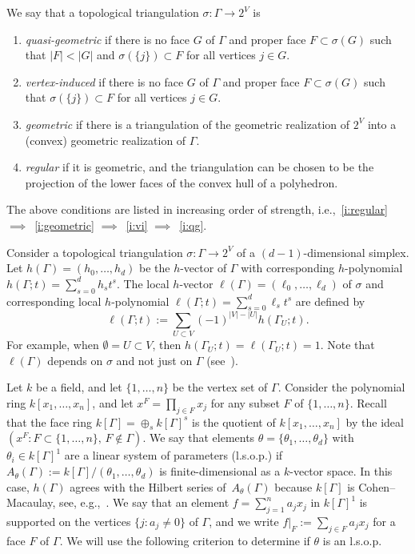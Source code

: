 We say that a topological triangulation $\sigma \colon \Gamma \to 2^V$ is 
\begin{enumerate}
\item\label{i:qg} \emph{quasi-geometric} if there is no face $G$ of $\Gamma$ and proper face $F \subset \sigma(G)$
such that $|F| < |G|$ and $\sigma(\{ j\}) \subset F$ for all vertices $j \in G$. 

\item\label{i:vi} \emph{vertex-induced}  
if there is no face $G$ of $\Gamma$ and proper face $F \subset \sigma(G)$ such that $\sigma(\{ j\}) \subset F$ for all vertices $j \in G$. 

\item\label{i:geometric} \emph{geometric} if there is a triangulation of the geometric realization of $2^V$ into a (convex) geometric realization of $\Gamma$. 

\item\label{i:regular} \emph{regular} if it is geometric, and the triangulation can be chosen to be the projection of the lower faces of the convex hull of a polyhedron. 
\end{enumerate}
The above conditions are listed in increasing order of strength, i.e.,~\eqref{i:regular} $\implies$~\eqref{i:geometric} $\implies$~\eqref{i:vi} $\implies$~\eqref{i:qg}. 

Consider a topological triangulation $\sigma \colon \Gamma \to 2^V$ of a $(d - 1)$-dimensional simplex. Let $h(\Gamma) = (h_0,\ldots,h_d)$ be the $h$-vector of $\Gamma$ with corresponding $h$-polynomial $h(\Gamma;t) = \sum_{s = 0}^d h_s t^s$. 
The local $h$-vector $\ell(\Gamma) = (\ell_0,\ldots,\ell_d)$ of $\sigma$ and corresponding local $h$-polynomial $\ell(\Gamma;t) = \sum_{s = 0}^d \ell_s t^s$
are defined by 
\begin{equation}\label{eq:localh}
\ell(\Gamma;t) := \sum_{U \subset V} (-1)^{|V| - |U|} h(\Gamma_U;t). 
\end{equation}
For example, when $\emptyset = U \subset V$, then $h(\Gamma_U;t) = \ell(\Gamma_U;t) = 1$. Note that  $\ell(\Gamma)$ depends on $\sigma$ and not just on $\Gamma$ (see~\cite[Example~2.3e]{Stanleylocalh}). 

Let $k$ be a field, and let $\{ 1, \ldots, n \}$ be the vertex set of $\Gamma$. Consider the polynomial ring $k[x_1,\ldots,x_n]$, and let $x^F = \prod_{j \in F} x_j$ for any subset $F$ of $\{ 1, \ldots, n \}$. 
Recall that the face ring $k[\Gamma] = \oplus_s k[\Gamma]^s$ 
is the quotient of $k[x_1,\ldots,x_n]$ by the ideal \mbox{$(x^F : F \subset \{ 1, \ldots, n \}, \, F \notin \Gamma )$}. 
We say that elements $ \theta = \{ \theta_1,\ldots,\theta_d \}$ with $\theta_i \in k[\Gamma]^1$ are a linear system of parameters (l.s.o.p.) if $A_\theta(\Gamma) := k[\Gamma]/(\theta_1, \dotsc, \theta_d)$ is finite-dimensional as a $k$-vector space. In this case, $h(\Gamma)$ agrees with the Hilbert series of~$A_\theta(\Gamma)$ because 
$k[\Gamma]$
is Cohen--Macaulay, see, e.g.,~\cite[pg. 61]{Stanleybook}. 
We say that an element $f = \sum_{j = 1}^n a_j x_j$ in $k[\Gamma]^1$ is supported on the vertices $\{ j : a_j \neq 0 \}$ of $\Gamma$, and we write $f|_F := \sum_{j \in F} a_j x_j$ for a face $F$ of $\Gamma$. We will use the following criterion to determine if $\theta$ is an l.s.o.p. 

